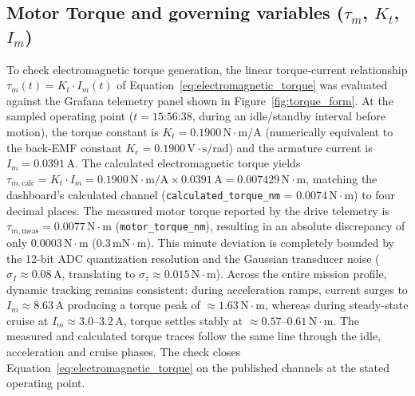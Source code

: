 \subsection{Motor Torque and governing variables (\texorpdfstring{$\tau_m$, $K_t$, $I_m$}{tau\_m, Kt, Im})}
To check electromagnetic torque generation, the linear torque-current relationship $\tau_m(t) = K_t \cdot I_m(t)$ of Equation~\eqref{eq:electromagnetic_torque} was evaluated against the Grafana telemetry panel shown in Figure~\ref{fig:torque_form}. At the sampled operating point ($t = \text{15:56:38}$, during an idle/standby interval before motion), the torque constant is $K_t = 0.1900\,\text{N}\cdot\text{m/A}$ (numerically equivalent to the back-EMF constant $K_e = 0.1900\,\text{V}\cdot\text{s/rad}$) and the armature current is $I_m = 0.0391\,\text{A}$. The calculated electromagnetic torque yields $\tau_{m,\text{calc}} = K_t \cdot I_m = 0.1900\,\text{N}\cdot\text{m/A} \times 0.0391\,\text{A} = 0.007429\,\text{N}\cdot\text{m}$, matching the dashboard's calculated channel (\texttt{calculated\_torque\_nm} = $0.0074\,\text{N}\cdot\text{m}$) to four decimal places. The measured motor torque reported by the drive telemetry is $\tau_{m,\text{meas}} = 0.0077\,\text{N}\cdot\text{m}$ (\texttt{motor\_torque\_nm}), resulting in an absolute discrepancy of only $0.0003\,\text{N}\cdot\text{m}$ ($0.3\,\text{mN}\cdot\text{m}$). This minute deviation is completely bounded by the 12-bit ADC quantization resolution and the Gaussian transducer noise ($\sigma_I \approx 0.08\,\text{A}$, translating to $\sigma_\tau \approx 0.015\,\text{N}\cdot\text{m}$). Across the entire mission profile, dynamic tracking remains consistent: during acceleration ramps, current surges to $I_m \approx 8.63\,\text{A}$ producing a torque peak of $\approx 1.63\,\text{N}\cdot\text{m}$, whereas during steady-state cruise at $I_m \approx 3.0$--$3.2\,\text{A}$, torque settles stably at $\approx 0.57$--$0.61\,\text{N}\cdot\text{m}$. The measured and calculated torque traces follow the same line through the idle, acceleration and cruise phases. The check closes Equation~\eqref{eq:electromagnetic_torque} on the published channels at the stated operating point.

